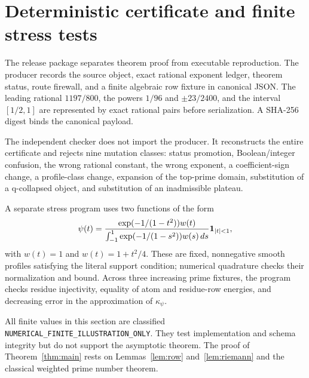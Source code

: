 \section{Deterministic certificate and finite stress tests}
\label{sec:certificate}

The release package separates theorem proof from executable reproduction.
The producer records the source object, exact rational exponent ledger,
theorem status, route firewall, and a finite algebraic row fixture in canonical
JSON.  The leading rational $1197/800$, the powers $1/96$ and
$\pm23/2400$, and the interval $[1/2,1]$ are represented by exact rational
pairs before serialization.  A SHA-256 digest binds the canonical payload.

The independent checker does not import the producer.  It reconstructs the
entire certificate and rejects nine mutation classes: status promotion,
Boolean/integer confusion, the wrong rational constant, the wrong exponent,
a coefficient-sign change, a profile-class change, expansion of the
top-prime domain, substitution of a q-collapsed object, and substitution of an
inadmissible plateau.

A separate stress program uses two functions of the form
\[
 \psi(t)=\frac{\exp(-1/(1-t^2))w(t)}
 {\int_{-1}^{1}\exp(-1/(1-s^2))w(s)\,ds}
 \mathbf{1}_{|t|<1},
\]
with $w(t)=1$ and $w(t)=1+t^2/4$.  These are fixed, nonnegative smooth
profiles satisfying the literal support condition; numerical quadrature checks
their normalization and bound.  Across three increasing prime fixtures, the
program checks residue injectivity, equality of atom and residue-row energies,
and decreasing error in the approximation of $\kappa_\psi$.

All finite values in this section are classified
\texttt{NUMERICAL\_FINITE\_ILLUSTRATION\_ONLY}.  They test implementation
and schema integrity but do not support the asymptotic theorem.  The proof of
Theorem~\ref{thm:main} rests on Lemmas~\ref{lem:row} and~\ref{lem:riemann}
and the classical weighted prime number theorem.
